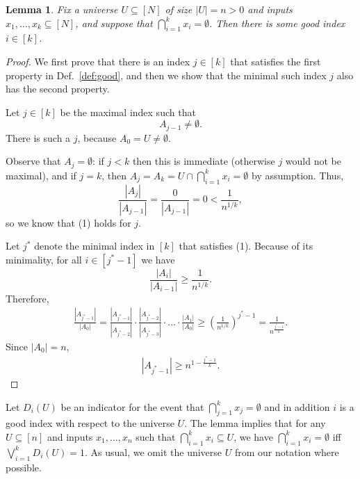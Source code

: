 \documentclass{article}
\theoremstyle{plain}
\newtheorem{lemma}[theorem]{Lemma}
\begin{document}
\begin{lemma}
  Fix a universe $U \subseteq [N]$ of size $|U| = n > 0$ and inputs $x_1,\ldots,x_k \subseteq [N]$,
  and suppose that $\bigcap_{i = 1}^k x_i = \emptyset$.
  Then there is some good index $i \in [k]$.
  \label{lemma:narrow}
\end{lemma}
\begin{proof}
  We first prove that there is an index $j \in [k]$ that satisfies the first property in Def.~\ref{def:good}, and then we show
  that the minimal such index $j$ also has the second property.

  Let $j \in [k]$ be the maximal index such that 
  \begin{equation*}
    A_{j-1} \neq \emptyset.
  \end{equation*}
  There is such a $j$, because $A_0 = U \neq \emptyset$.

  Observe that $A_{j} = \emptyset$:
  if $j < k$ then this is immediate (otherwise $j$ would not be maximal),
  and
  if $j = k$, then $A_j = A_k = U \cap \bigcap_{i=1}^k x_i = \emptyset$ by assumption.
  Thus,
  \begin{equation*}
    \frac{|A_j|}{|A_{j-1}|} = \frac{0}{|A_{j-1}|} = 0 < \frac{1}{n^{1/k}},
  \end{equation*}
  so we know that (1) holds for $j$.


  Let $j^{\ast}$ denote the minimal index in $[k]$ that satisfies (1).
  Because of its minimality, for all $i \in [j^\ast-1]$ we have
  \begin{equation*}
    \frac{|A_i|}{|A_{i-1}|} \geq \frac{1}{n^{1/k}}.
  \end{equation*}
  Therefore,
  \begin{align*}
    \frac{|A_{j^\ast - 1}|}{|A_0|} = 
    \frac{|A_{j^\ast - 1}|}{|A_{j^\ast-2}|} \cdot \frac{|A_{j^\ast-2}|}{|A_{j^\ast-3}|} \cdot \ldots \cdot \frac{|A_1|}{|A_0|}
    \geq
    \left(  \frac{1}{n^{1/k}} \right)^{j^\ast - 1}
    =
    \frac{1}{n^{\frac{j^\ast - 1}{k}}}.
  \end{align*}
  Since $|A_0| = n$, 
  \begin{align*}
    |A_{j^\ast - 1}| \geq n^{1 - \frac{j^\ast-1}{k}}.
  \end{align*}
\end{proof}

Let $D_i(U)$ be an indicator for the event that $\bigcap_{j = 1}^k x_j = \emptyset$ and in addition $i$ is a good index
with respect to the universe $U$.
The lemma implies that for any $U \subseteq [n]$ and inputs $x_1,\ldots,x_n$ such that $\bigcap_{i = 1}^k x_i \subseteq U$,
we have
$\bigcap_{i = 1}^k x_i = \emptyset$
iff $\bigvee_{i = 1}^k D_i(U) = 1$.
As usual, we omit the universe $U$ from our notation where possible.
\end{document}
